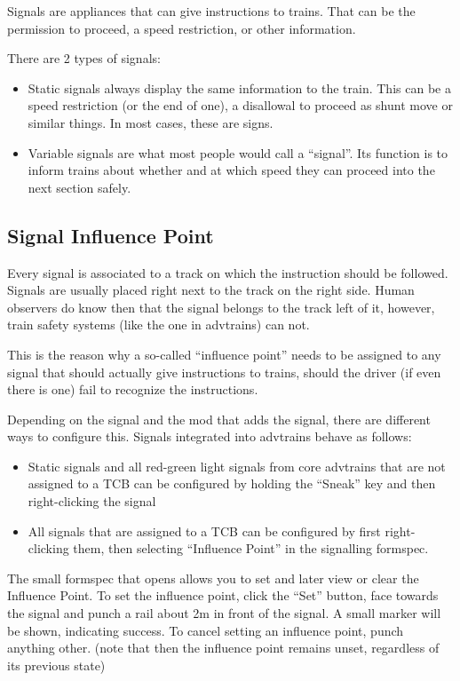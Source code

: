 \documentclass[english]{paper}
\begin{document}
Signals are appliances that can give instructions to trains. That
can be the permission to proceed, a speed restriction, or other information.

There are 2 types of signals:
\begin{itemize}
\item Static signals always display the same information to the train. This
can be a speed restriction (or the end of one), a disallowal to proceed
as shunt move or similar things. In most cases, these are signs.
\item Variable signals are what most people would call a ``signal''. Its
function is to inform trains about whether and at which speed they
can proceed into the next section safely.
\end{itemize}

\subsection{Signal Influence Point}

Every signal is associated to a track on which the instruction should
be followed. Signals are usually placed right next to the track on
the right side. Human observers do know then that the signal belongs
to the track left of it, however, train safety systems (like the one
in advtrains) can not.

This is the reason why a so-called ``influence point'' needs to
be assigned to any signal that should actually give instructions to
trains, should the driver (if even there is one) fail to recognize
the instructions.

Depending on the signal and the mod that adds the signal, there are
different ways to configure this. Signals integrated into advtrains
behave as follows:
\begin{itemize}
\item Static signals and all red-green light signals from core advtrains
that are not assigned to a TCB can be configured by holding the ``Sneak''
key and then right-clicking the signal
\item All signals that are assigned to a TCB can be configured by first
right-clicking them, then selecting ``Influence Point'' in the signalling
formspec.
\end{itemize}
The small formspec that opens allows you to set and later view or
clear the Influence Point. To set the influence point, click the ``Set''
button, face towards the signal and punch a rail about 2m in front
of the signal. A small marker will be shown, indicating success. To
cancel setting an influence point, punch anything other. (note that
then the influence point remains unset, regardless of its previous
state)
\end{document}
